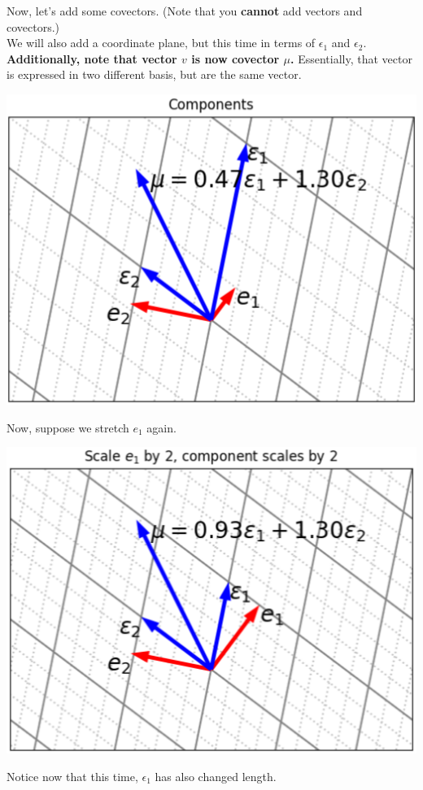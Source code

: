 \documentclass[10pt]{article}
\begin{document}
Now, let's add some covectors.  (Note that you \textbf{cannot} add vectors and covectors.)\\
We will also add a coordinate plane, but this time in terms of $\epsilon_1$ and $\epsilon_2$.\\
\textbf{Additionally, note that vector $v$ is now covector $\mu$.}  Essentially, that vector is expressed in two different basis, but are the same vector.
\begin{center}
    \includegraphics*[scale=0.9]{W2_8.png}
\end{center}
Now, suppose we stretch $e_1$ again.
\begin{center}
    \includegraphics*[scale=0.9]{W2_9.png}
\end{center}
Notice now that this time, $\epsilon_1$ has also changed length.
\end{document}
